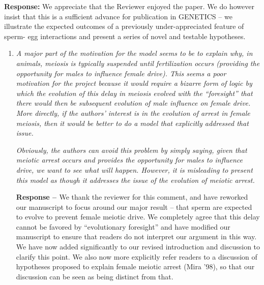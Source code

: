 \documentclass[12pt,letterpaper]{article}
\newcommand{\gc}[1]{{ \color{red} #1}}
\begin{document}
{\bf{Response:}} \gc{We appreciate that the Reviewer enjoyed the paper.}
We do however insist that this is a sufficient advance for publication in GENETICS --
 we illustrate the expected outcomes of a previously under-appreciated feature of sperm-
 egg interactions and present a series of novel and testable hypotheses. 
\begin{enumerate}
\item
\begin{singlespace}
\emph{A major part of the motivation for the model seems to be to explain why, in
animals, meiosis is typically suspended until fertilization occurs (providing
the opportunity for males to influence female drive).  This seems a poor
motivation for the project because it would require a bizarre form of logic by
which the evolution of this delay in meiosis evolved with the ``foresight'' that
there would then be subsequent evolution of male influence on female drive. 
More directly, if the authors' interest is in the evolution of arrest in female
meiosis, then it would be better to do a model that explicitly addressed that
issue.  }

\emph{Obviously, the authors can avoid this problem by simply saying, given that
meiotic arrest occurs and provides the opportunity for males to influence drive,
we want to see what will happen.  However, it is misleading to present this
model as though it addresses the issue of the evolution of meiotic arrest.}
\end{singlespace}

\begin{singlespace}
{\bf{Response -- }} We thank the reviewer for this comment, and have reworked our manuscript to focus 
	around our major result -- that sperm are expected to evolve to prevent female meiotic drive. 
	We completely agree that this delay cannot be favored by ``evolutionary foresight'' and have 
	modified our manuscript to ensure that readers do not
        interpret our argument in this way. We have now added
          significantly to our  revised introduction and discussion to
          clarify this point. 	
We also now more explicitly refer readers to a discussion of
        hypotheses proposed to explain female meiotic arrest (Mira
        '98), so that our discussion can be seen as being distinct
        from that. 


%	
\end{singlespace}


\end{enumerate}
\end{document}
